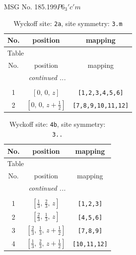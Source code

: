 \documentclass[fleqn,8pt]{jsarticle}
\begin{document}
\setcounter{MaxMatrixCols}{32}

\renewcommand{\tablename}{Table~}
\renewcommand{\figurename}{Figure~}
\begin{center}
\LARGE
MSG No. 185.199\quad$P6_{3}'c'm$
\end{center}
\renewcommand{\arraystretch}{1.2}
\begin{longtable}{ccc}
\caption{Wyckoff site: {\tt 2a}, site symmetry: {\tt 3.m}}
 \\
 \hline \hline
No. & position & mapping \\ \hline \endfirsthead

\multicolumn{2}{l}{\tablename\ \thetable{}} \\
 \hline \hline
No. & position & mapping \\ \hline \endhead

 \hline \hline
\multicolumn{2}{r}{\footnotesize\it continued ...} \\ \endfoot

 \hline \hline
\multicolumn{2}{r}{} \\ \endlastfoot

1 & $\left[ 0,\, 0,\, z \right]$ & {\tt [1,2,3,4,5,6]} \\ \hline
2 & $\left[ 0,\, 0,\, z + \frac{1}{2} \right]$ & {\tt [7,8,9,10,11,12]} \\
\end{longtable}
\renewcommand{\arraystretch}{1.2}
\begin{longtable}{ccc}
\caption{Wyckoff site: {\tt 4b}, site symmetry: {\tt 3..}}
 \\
 \hline \hline
No. & position & mapping \\ \hline \endfirsthead

\multicolumn{2}{l}{\tablename\ \thetable{}} \\
 \hline \hline
No. & position & mapping \\ \hline \endhead

 \hline \hline
\multicolumn{2}{r}{\footnotesize\it continued ...} \\ \endfoot

 \hline \hline
\multicolumn{2}{r}{} \\ \endlastfoot

1 & $\left[ \frac{1}{3},\, \frac{2}{3},\, z \right]$ & {\tt [1,2,3]} \\ \hline
2 & $\left[ \frac{2}{3},\, \frac{1}{3},\, z \right]$ & {\tt [4,5,6]} \\ \hline
3 & $\left[ \frac{2}{3},\, \frac{1}{3},\, z + \frac{1}{2} \right]$ & {\tt [7,8,9]} \\ \hline
4 & $\left[ \frac{1}{3},\, \frac{2}{3},\, z + \frac{1}{2} \right]$ & {\tt [10,11,12]} \\
\end{longtable}
\end{document}

